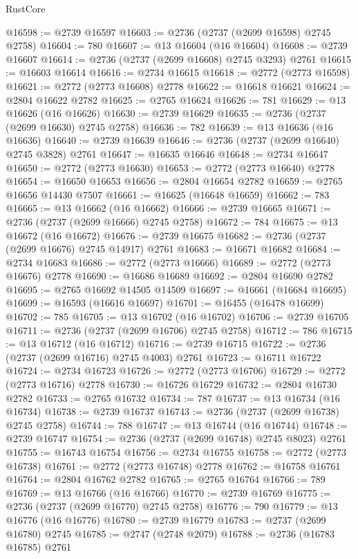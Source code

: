 \begin{lexlean}{RustCore}
\begin{coremodule}
@16598 := @2739 @16597
@16603 := @2736 (@2737 (@2699 @16598) @2745 @2758)
@16604 := 780
@16607 := @13 @16604 (@16 @16604)
@16608 := @2739 @16607
@16614 := @2736 (@2737 (@2699 @16608) @2745 @3293) @2761
@16615 := @16603 @16614
@16616 := @2734 @16615
@16618 := @2772 (@2773 @16598)
@16621 := @2772 (@2773 @16608) @2778
@16622 := @16618 @16621
@16624 := @2804 @16622 @2782
@16625 := @2765 @16624
@16626 := 781
@16629 := @13 @16626 (@16 @16626)
@16630 := @2739 @16629
@16635 := @2736 (@2737 (@2699 @16630) @2745 @2758)
@16636 := 782
@16639 := @13 @16636 (@16 @16636)
@16640 := @2739 @16639
@16646 := @2736 (@2737 (@2699 @16640) @2745 @3828) @2761
@16647 := @16635 @16646
@16648 := @2734 @16647
@16650 := @2772 (@2773 @16630)
@16653 := @2772 (@2773 @16640) @2778
@16654 := @16650 @16653
@16656 := @2804 @16654 @2782
@16659 := @2765 @16656 @14430 @7507
@16661 := @16625 (@16648 @16659)
@16662 := 783
@16665 := @13 @16662 (@16 @16662)
@16666 := @2739 @16665
@16671 := @2736 (@2737 (@2699 @16666) @2745 @2758)
@16672 := 784
@16675 := @13 @16672 (@16 @16672)
@16676 := @2739 @16675
@16682 := @2736 (@2737 (@2699 @16676) @2745 @14917) @2761
@16683 := @16671 @16682
@16684 := @2734 @16683
@16686 := @2772 (@2773 @16666)
@16689 := @2772 (@2773 @16676) @2778
@16690 := @16686 @16689
@16692 := @2804 @16690 @2782
@16695 := @2765 @16692 @14505 @14509
@16697 := @16661 (@16684 @16695)
@16699 := @16593 (@16616 @16697)
@16701 := @16455 (@16478 @16699)
@16702 := 785
@16705 := @13 @16702 (@16 @16702)
@16706 := @2739 @16705
@16711 := @2736 (@2737 (@2699 @16706) @2745 @2758)
@16712 := 786
@16715 := @13 @16712 (@16 @16712)
@16716 := @2739 @16715
@16722 := @2736 (@2737 (@2699 @16716) @2745 @4003) @2761
@16723 := @16711 @16722
@16724 := @2734 @16723
@16726 := @2772 (@2773 @16706)
@16729 := @2772 (@2773 @16716) @2778
@16730 := @16726 @16729
@16732 := @2804 @16730 @2782
@16733 := @2765 @16732
@16734 := 787
@16737 := @13 @16734 (@16 @16734)
@16738 := @2739 @16737
@16743 := @2736 (@2737 (@2699 @16738) @2745 @2758)
@16744 := 788
@16747 := @13 @16744 (@16 @16744)
@16748 := @2739 @16747
@16754 := @2736 (@2737 (@2699 @16748) @2745 @8023) @2761
@16755 := @16743 @16754
@16756 := @2734 @16755
@16758 := @2772 (@2773 @16738)
@16761 := @2772 (@2773 @16748) @2778
@16762 := @16758 @16761
@16764 := @2804 @16762 @2782
@16765 := @2765 @16764
@16766 := 789
@16769 := @13 @16766 (@16 @16766)
@16770 := @2739 @16769
@16775 := @2736 (@2737 (@2699 @16770) @2745 @2758)
@16776 := 790
@16779 := @13 @16776 (@16 @16776)
@16780 := @2739 @16779
@16783 := @2737 (@2699 @16780) @2745
@16785 := @2747 (@2748 @2079)
@16788 := @2736 (@16783 @16785) @2761

\end{coremodule}
\end{lexlean}
